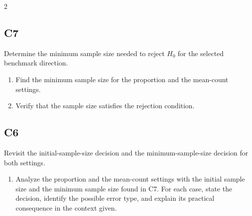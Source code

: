 \documentclass[12pt]{article}
\begin{document}
\begin{multicols}{2}
	\subsection*{C7}
	Determine the minimum sample size needed to reject \(H_0\) for the selected benchmark direction.
	\begin{enumerate}
		\item Find the minimum sample size for the proportion and the mean-count settings.
		\item Verify that the sample size satisfies the rejection condition.
	\end{enumerate}
	\subsection*{C6}
	Revisit the initial-sample-size decision and the minimum-sample-size decision for both settings.
	\begin{enumerate}
		\item Analyze the proportion and the mean-count settings with the initial sample size and the minimum sample size found in C7. For each case, state the decision, identify the possible error type, and explain its practical consequence in the context given.
	\end{enumerate}
	\end{multicols}
\end{document}
